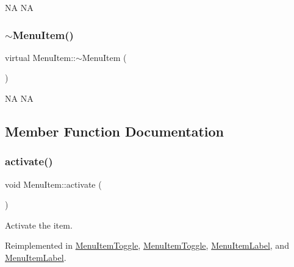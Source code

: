 NA  NA \mbox{\label{classMenuItem_a6aee8c9035c65c1ffc28b5d0f2a6c00f}} 
\subsubsection{\texorpdfstring{$\sim$\+Menu\+Item()}{~MenuItem()}\hspace{0.1cm}{\footnotesize\ttfamily [2/2]}}
{\footnotesize\ttfamily virtual Menu\+Item\+::$\sim$\+Menu\+Item (\begin{DoxyParamCaption}{ }\end{DoxyParamCaption})\hspace{0.3cm}{\ttfamily [virtual]}}

NA  NA 

\subsection{Member Function Documentation}
\mbox{\label{classMenuItem_a2c5e2d7641bbf1dc9da877557c6c5e92}} 
\subsubsection{\texorpdfstring{activate()}{activate()}\hspace{0.1cm}{\footnotesize\ttfamily [1/2]}}
{\footnotesize\ttfamily void Menu\+Item\+::activate (\begin{DoxyParamCaption}{ }\end{DoxyParamCaption})\hspace{0.3cm}{\ttfamily [virtual]}}

Activate the item. 

Reimplemented in \hyperlink{classMenuItemToggle_a39fc9a7827cfe809858f39f6bce8a3e7}{Menu\+Item\+Toggle}, \hyperlink{classMenuItemToggle_a565753be8b77ee82cb1ec98f21924d49}{Menu\+Item\+Toggle}, \hyperlink{classMenuItemLabel_a6a5e8b0d94a07126c084ec1ba1695c13}{Menu\+Item\+Label}, and \hyperlink{classMenuItemLabel_a03b829211e9bf837d6e2febc1bee290c}{Menu\+Item\+Label}.

\mbox{\label{classMenuItem_a914d3ef5d07ab6da23618d4d8c3e33cd}} 
